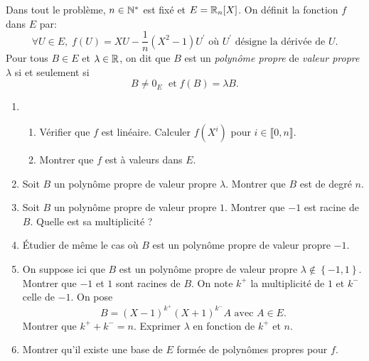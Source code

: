 
\noindent
Dans tout le problème, $n \in  \mathbb{N}^*$ est fixé et $E = \mathbb{R}_n[X]$.\newline
On définit la fonction $f$ dans $E$ par:
\[
\forall U \in E, \; f(U) = XU - \frac{1}{n}(X^2-1)U^\prime \text{ où } U^\prime \text{ désigne la dérivée de } U.
\]
Pour tous $B\in E$ et $\lambda \in \mathbb{R}$, on dit que $B$ est un \emph{polynôme propre} de \emph{valeur propre} $\lambda$ si et seulement si
\[
B \neq 0_E\; \text{ et} \; f(B)=\lambda B.
\]
\begin{enumerate}
\item \begin{enumerate}
\item Vérifier que $f$ est linéaire. Calculer $f(X^i)$ pour $i\in \llbracket 0,n \rrbracket$.
\item Montrer que  $f$ est à valeurs dans $E$.
\end{enumerate}
\item Soit $B$ un polynôme propre de valeur propre $\lambda$. Montrer que $B$ est de degré $n$.
\item Soit $B$ un polynôme propre de valeur propre $1$. Montrer que $-1$ est racine de $B$. Quelle est sa multiplicité ?
\item \'Etudier de même le cas où $B$ est un polynôme propre de valeur propre $-1$.
\item On suppose ici que $B$ est un polynôme propre de valeur propre $\lambda \notin \left\lbrace -1,1 \right\rbrace$. Montrer que $-1$ et $1$ sont racines de $B$. On note $k^+$ la multiplicité de $1$ et $k^-$ celle de $-1$.\newline
On pose
\[
B=(X-1)^{k^+}(X+1)^{k^-}A \text{ avec } A\in E.
\]
 Montrer que $k^+ + k^- = n$. Exprimer $\lambda$ en fonction de $k^+$ et $n$.
\item Montrer qu'il existe une base de $E$ formée de polynômes propres pour $f$.
\end{enumerate}
